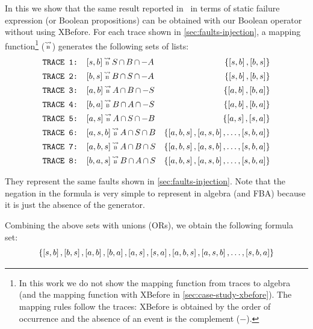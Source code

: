 \documentclass[12pt,openright,twoside,a4paper,oldfontcommands,english,brazil,final]{abntex2}
\theoremstyle{theo}
\def\tracetobool{\ensuremath\operatorname{\stackrel{\leadsto}{\text{\tiny B}}}}
\newcommand{\setsin}[1]{\ensuremath\left\{ #1 \right\}}
\newcommand{\listsin}[1]{\ensuremath\left[ #1 \right]}
\def\inter{\ensuremath\operatorname{\cap}}
\begin{document}
In this  we show that the same result reported in~\cite{DM2012} in terms of static failure expression (or Boolean propositions) can be obtained with our Boolean operator without using \ac{XBefore}.
For each trace shown in \cref{sec:faults-injection}, a mapping function\footnote{In this work we do not show the mapping function from traces to \ac{algebra} (and the mapping function with \ac{XBefore} in \cref{sec:case-study-xbefore}).
The mapping rules follow the traces: \ac{XBefore} is obtained by the order of occurrence and the absence of an event is the complement ($-$).} ($\tracetobool$) generates the following sets of lists:
%
\begin{align*}
\text{\texttt{TRACE 1: }}&[s,b] \tracetobool S \inter B \inter -A & \setsin{\listsin{s,b},\listsin{b,s}}\\
\text{\texttt{TRACE 2: }}&[b,s] \tracetobool B \inter S \inter -A & \setsin{\listsin{s,b},\listsin{b,s}}\\
\text{\texttt{TRACE 3: }}&[a,b] \tracetobool A \inter B \inter -S & \setsin{\listsin{a,b},\listsin{b,a}}\\
\text{\texttt{TRACE 4: }}&[b,a] \tracetobool B \inter A \inter -S & \setsin{\listsin{a,b},\listsin{b,a}}\\
\text{\texttt{TRACE 5: }}&[a,s] \tracetobool A \inter S \inter -B & \setsin{\listsin{a,s},\listsin{s,a}}\\
\text{\texttt{TRACE 6: }}&[a,s,b] \tracetobool A \inter S \inter B & \setsin{\listsin{a,b,s},\listsin{a,s,b},\ldots,\listsin{s,b,a}}\\
\text{\texttt{TRACE 7: }}&[a,b,s] \tracetobool A \inter B \inter S & \setsin{\listsin{a,b,s},\listsin{a,s,b},\ldots,\listsin{s,b,a}}\\
\text{\texttt{TRACE 8: }}&[b,a,s] \tracetobool B \inter A \inter S & \setsin{\listsin{a,b,s},\listsin{a,s,b},\ldots,\listsin{s,b,a}}\\
\end{align*}

They represent the same faults shown in \cref{sec:faults-injection}.
Note that the negation in the formula is very simple to represent in \ac{algebra} (and \ac{FBA}) because it is just the absence of the generator.

Combining the above sets with unions (ORs), we obtain the following formula set:
%
\[
\left\{ \listsin{s,b}, \listsin{b,s}, \listsin{a,b}, \listsin{b,a}, \listsin{a,s}, \listsin{s,a}, \listsin{a,b,s}, \listsin{a,s,b},\ldots,\listsin{s,b,a} \right\}
\]
\end{document}
